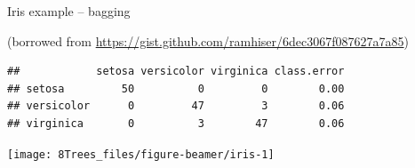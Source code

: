 \documentclass[10pt,ignorenonframetext,]{beamer}
\newenvironment{Shaded}{\begin{snugshade}}{\end{snugshade}}
\newcommand{\KeywordTok}[1]{\textcolor[rgb]{0.13,0.29,0.53}{\textbf{#1}}}
\newcommand{\DataTypeTok}[1]{\textcolor[rgb]{0.13,0.29,0.53}{#1}}
\newcommand{\DecValTok}[1]{\textcolor[rgb]{0.00,0.00,0.81}{#1}}
\newcommand{\StringTok}[1]{\textcolor[rgb]{0.31,0.60,0.02}{#1}}
\newcommand{\OperatorTok}[1]{\textcolor[rgb]{0.81,0.36,0.00}{\textbf{#1}}}
\newcommand{\NormalTok}[1]{#1}
\begin{document}
\begin{frame}[fragile]

\begin{block}{Iris example -- bagging}

\tiny
(borrowed from
\url{https://gist.github.com/ramhiser/6dec3067f087627a7a85})

\vspace{1mm}

\scriptsize

\begin{Shaded}
\end{Shaded}

\begin{verbatim}
##            setosa versicolor virginica class.error
## setosa         50          0         0        0.00
## versicolor      0         47         3        0.06
## virginica       0          3        47        0.06
\end{verbatim}

\vspace{3mm}

\begin{center}\texttt{[image: 8Trees\_files/figure-beamer/iris-1]} \end{center}

\end{block}

\end{frame}
\end{document}
